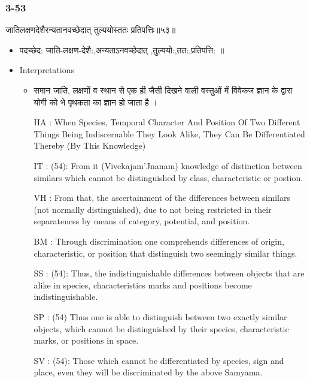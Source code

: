 \begin{frame}[fragile]\frametitle{3-53}
\begin{sanskrit}
जातिलक्षणदेशैरन्यतानवच्छेदात् तुल्ययोस्ततः प्रतिपत्तिः॥५३॥
\end{sanskrit}

	\begin{itemize}
	\item पदच्छेद:  जाति-लक्षण-देशै:,अन्यताऽनवच्छेदात् ,तुल्ययो:,तत:,प्रतिपत्ति: ॥
	\item Interpretations
		\begin{itemize}	
		\item समान जाति, लक्षणों व स्थान से एक ही जैसी दिखने वाली वस्तुओं में विवेकज ज्ञान के द्वारा योगी को भे पृथकता का ज्ञान हो जाता है ।
		\item [HA]: When Species, Temporal Character And Position Of Two Different Things Being Indiscernable They Look Alike, They Can Be Differentiated Thereby (By This Knowledge)
		\item [IT]: (54): From it (Vivekajam’Jnanam) knowledge of distinction between similars which cannot be distinguished by class, characteristic or postion.
		\item [VH]: From that, the ascertainment of the differences between similars (not normally distinguished), due to not being restricted in their separateness by means of category, potential, and position.
		\item [BM]: Through discrimination one comprehends differences of origin, characteristic, or position that distinguish two seemingly similar things.
		\item [SS]: (54): Thus, the indistinguishable differences between objects that are alike in species, characteristics marks and positions become indistinguishable.
		\item [SP]: (54) Thus one is able to distinguish between two exactly similar objects, which cannot be distinguished by their species, characteristic marks, or positions in space.
		\item [SV]: (54): Those which cannot be differentiated by species, sign and place, even they will be discriminated by the above Samyama. 
		\end{itemize}
	\end{itemize}
\end{frame}

